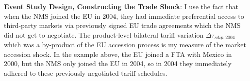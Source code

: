 \documentclass{article}
\begin{document}
\begin{figure}[h]
    \centering
\end{figure}

\textbf{Event Study Design, Constructing the Trade Shock}: \footnotesize{I use the fact that when the NMS joined the EU in 2004, they had immediate preferential access to third-party markets via previously signed EU trade agreements which the NMS did not get to negotiate. The product-level bilateral tariff variation $\Delta \tau_{sdip,2004}$ which was a by-product of the EU accession process is my measure of the market accession shock. In the example above, the EU joined a FTA with Mexico in 2000, but the NMS only joined the EU in 2004, so in 2004 they immediately adhered to these previously negotiated tariff schedules.}
\end{document}
